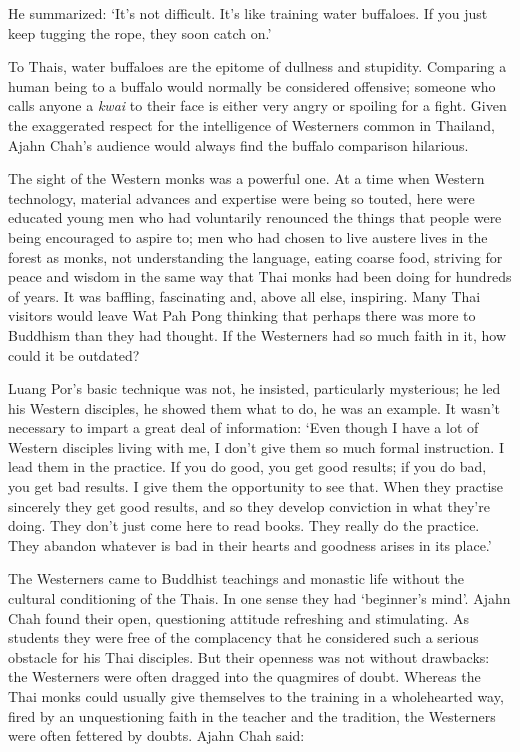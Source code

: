 He summarized: `It's not difficult. It's like training water buffaloes.
If you just keep tugging the rope, they soon catch on.'

To Thais, water buffaloes are the epitome of dullness and stupidity.
Comparing a human being to a buffalo would normally be considered
offensive; someone who calls anyone a \emph{kwai} to their face is
either very angry or spoiling for a fight. Given the exaggerated respect
for the intelligence of Westerners common in Thailand, Ajahn Chah's
audience would always find the buffalo comparison hilarious.

The sight of the Western monks was a powerful one. At a time when
Western technology, material advances and expertise were being so
touted, here were educated young men who had voluntarily renounced the
things that people were being encouraged to aspire to; men who had
chosen to live austere lives in the forest as monks, not understanding
the language, eating coarse food, striving for peace and wisdom in the
same way that Thai monks had been doing for hundreds of years. It was
baffling, fascinating and, above all else, inspiring. Many Thai visitors
would leave Wat Pah Pong thinking that perhaps there was more to
Buddhism than they had thought. If the Westerners had so much faith in
it, how could it be outdated?

Luang Por's basic technique was not, he insisted, particularly
mysterious; he led his Western disciples, he showed them what to do, he
was an example. It wasn't necessary to impart a great deal of
information: `Even though I have a lot of Western disciples living with
me, I don't give them so much formal instruction. I lead them in the
practice. If you do good, you get good results; if you do bad, you get
bad results. I give them the opportunity to see that. When they practise
sincerely they get good results, and so they develop conviction in what
they're doing. They don't just come here to read books. They really do
the practice. They abandon whatever is bad in their hearts and goodness
arises in its place.'

The Westerners came to Buddhist teachings and monastic life without the
cultural conditioning of the Thais. In one sense they had `beginner's
mind'. Ajahn Chah found their open, questioning attitude refreshing and
stimulating. As students they were free of the complacency that he
considered such a serious obstacle for his Thai disciples. But their
openness was not without drawbacks: the Westerners were often dragged
into the quagmires of doubt. Whereas the Thai monks could usually give
themselves to the training in a wholehearted way, fired by an
unquestioning faith in the teacher and the tradition, the Westerners
were often fettered by doubts. Ajahn Chah said:

